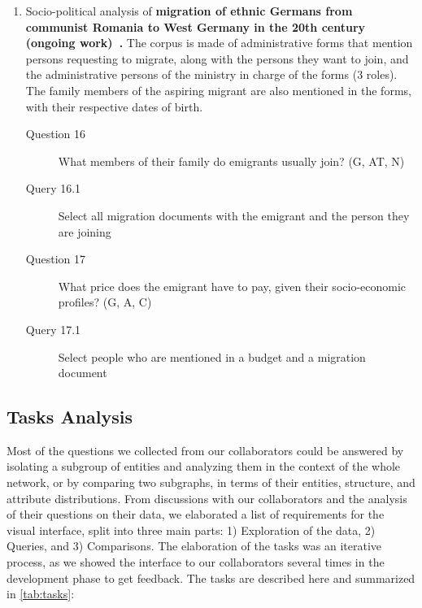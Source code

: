 \begin{enumerate}
    \item Socio-political analysis of \textbf{migration of ethnic Germans from communist Romania to West Germany in the 20th century (ongoing work)~\cite{diminescuMigrationEthnicGermans2020}.}
    The corpus is made of administrative forms that mention persons requesting to migrate, along with the persons they want to join, and the administrative persons of the ministry in charge of the forms (3 roles).
    The family members of the aspiring migrant are also mentioned in the forms, with their respective dates of birth.
     \begin{footnotesize}
    \begin{description}
    \item[Question 16] What members of their family do emigrants usually join? (G, AT, N)
    \item[\myindent Query 16.1] Select all migration documents with the emigrant and the person they are joining
    \item[Question 17] What price does the emigrant have to pay, given their socio-economic profiles? (G, A, C)
    \item[\myindent Query 17.1] Select people who are mentioned in a budget and a migration document
    \end{description}
    \end{footnotesize}
\end{enumerate}


\subsection{Tasks Analysis}

Most of the questions we collected from our collaborators could be answered by isolating a subgroup of entities and analyzing them in the context of the whole network, or by comparing two subgraphs, in terms of their entities, structure, and attribute distributions.
From discussions with our collaborators and the analysis of their questions on their data, we elaborated a list of requirements for the visual interface, split into three main parts: 1) Exploration of the data, 2) Queries, and 3) Comparisons.
The elaboration of the tasks was an iterative process, as we showed the interface to our collaborators several times in the development phase to get feedback.
The tasks are described here and summarized in \autoref{tab:tasks}:

